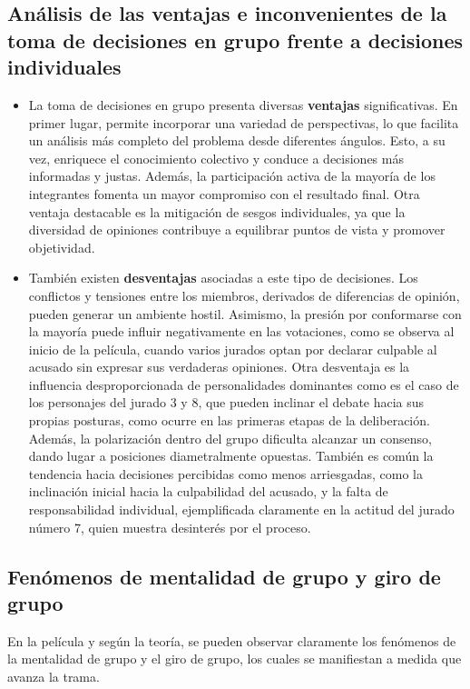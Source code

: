 \documentclass{article}
\begin{document}
\subsection{Análisis de las ventajas e inconvenientes de la toma de decisiones en grupo frente a decisiones individuales}

\begin{itemize}
    \item La toma de decisiones en grupo presenta diversas \textbf{ventajas} significativas. En primer lugar, permite incorporar una variedad de perspectivas, lo que facilita un análisis más completo del problema desde diferentes ángulos. Esto, a su vez, enriquece el conocimiento colectivo y conduce a decisiones más informadas y justas. Además, la participación activa de la mayoría de los integrantes fomenta un mayor compromiso con el resultado final. Otra ventaja destacable es la mitigación de sesgos individuales, ya que la diversidad de opiniones contribuye a equilibrar puntos de vista y promover objetividad.
    \item También existen \textbf{desventajas} asociadas a este tipo de decisiones. Los conflictos y tensiones entre los miembros, derivados de diferencias de opinión, pueden generar un ambiente hostil. Asimismo, la presión por conformarse con la mayoría puede influir negativamente en las votaciones, como se observa al inicio de la película, cuando varios jurados optan por declarar culpable al acusado sin expresar sus verdaderas opiniones. Otra desventaja es la influencia desproporcionada de personalidades dominantes como es el caso de los personajes del jurado 3 y 8, que pueden inclinar el debate hacia sus propias posturas, como ocurre en las primeras etapas de la deliberación. Además, la polarización dentro del grupo dificulta alcanzar un consenso, dando lugar a posiciones diametralmente opuestas. También es común la tendencia hacia decisiones percibidas como menos arriesgadas, como la inclinación inicial hacia la culpabilidad del acusado, y la falta de responsabilidad individual, ejemplificada claramente en la actitud del jurado número 7, quien muestra desinterés por el proceso.

\end{itemize}

\subsection{Fenómenos de mentalidad de grupo y giro de grupo}

En la película y según la teoría, se pueden observar claramente los fenómenos de la mentalidad de grupo y el giro de grupo, los cuales se manifiestan a medida que avanza la trama.
\end{document}
